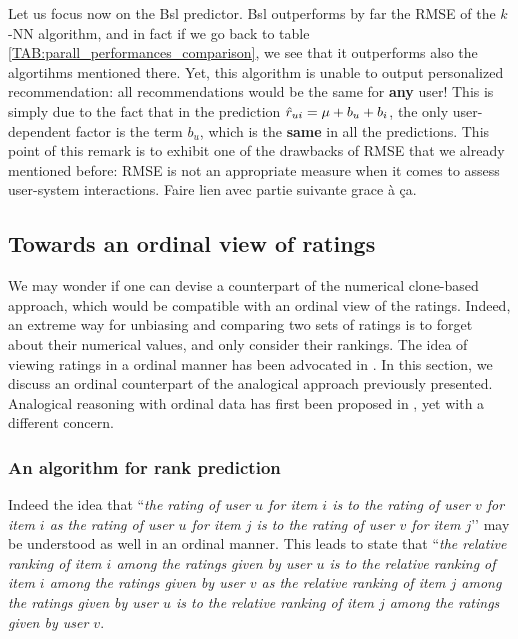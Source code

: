 Let us focus now on the Bsl predictor. Bsl outperforms by far the RMSE of the
$k$-NN algorithm, and in fact if we go back to table
\ref{TAB:parall_performances_comparison}, we see that it outperforms also the
algortihms mentioned there. Yet, this algorithm is unable to output
personalized recommendation: all recommendations would be the same for
\textbf{any} user! This is simply due to the fact that in the prediction
$\hat{r}_{ui} = \mu  + b_u + b_i$, the only user-dependent factor is the term
$b_u$, which is the \textbf{same} in all the predictions. This point of this
remark is to exhibit one of the drawbacks of RMSE that we already mentioned
before: RMSE is not an appropriate measure when it comes to assess user-system
interactions. Faire lien avec partie suivante grace à ça.

\subsection{Towards an ordinal view of ratings}
\label{ORDINAL_POV}

We may wonder if one can devise a counterpart of the numerical clone-based
approach, which would be compatible with an ordinal view of the ratings.
Indeed, an extreme way for unbiasing and comparing two sets of ratings is to
forget about their numerical values, and only consider their rankings.  The
idea of viewing ratings in a ordinal manner has been advocated in
\cite{KorSillRECSYS11}.
In this section, we discuss an ordinal counterpart of the analogical approach
previously presented.  Analogical reasoning with ordinal data has first been
proposed in \cite{MicBarCAP09}, yet with a different concern.

\subsubsection{An algorithm for rank prediction}
Indeed the idea that ``\textit{the rating of user $u$ for item $i$ is to the
rating of user $v$ for item $i$ as the rating of user $u$ for item $j$ is to
the rating of user $v$ for item $j$}’’ may be understood  as well in an ordinal
manner. This leads to state that ``\textit{the relative ranking of item $i$
  among the ratings given by user $u$  is to the relative ranking of item $i$
  among the ratings given by user $v$ as the relative ranking of item $j$ among
  the ratings given by user $u$  is to the relative ranking of item $j$ among
the ratings given by user $v$}.

